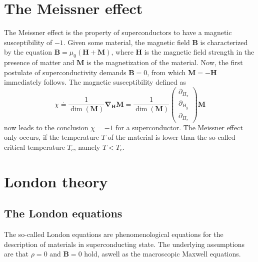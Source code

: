 \documentclass{report}
\numberwithin{tm}{section}
\newcommand\vect[1]{\ensuremath{\bm{#1}}}
\begin{document}
\section{The Meissner effect}
The Meissner effect is the property of superconductors to have a magnetic susceptibility of $-1$. Given some material, the magnetic field $\vect{B}$ is characterized by the equation $\vect{B} = \mu_0(\vect{H}+ \vect{M})$, where $\vect{H}$ is the magnetic field strength in the presence of matter and $\vect{M}$ is the magnetization of the material. Now, the first postulate of superconductivity demands $\vect{B} = 0$, from which $\vect{M} = -\vect{H}$ immediately follows. The magnetic susceptibility defined as \begin{equation}
	\chi \doteq \frac{1}{\dim(\vect{M})}\vect{\nabla}_{\vect{H}}\vect{M} = \frac{1}{\dim(\vect{M})}\begin{pmatrix}
		\partial_{H_x} \\ \partial_{H_y} \\ \partial_{H_z}
	\end{pmatrix}\vect{M}
\end{equation} now leads to the conclusion $\chi = -1$ for a superconductor. The Meissner effect only occurs, if the temperature $T$ of the material is lower than the so-called critical temperature $T_c$, namely $T < T_c$.

\section{London theory}
\subsection{The London equations}
The so-called London equations are phenomenological equations for the description of materials in superconducting state. The underlying assumptions are that $\rho = 0$ and $\vect{B} = 0$ hold, aswell as the macroscopic Maxwell equations.
\end{document}
